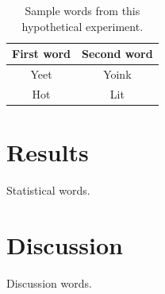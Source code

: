 \documentclass[man,12pt,floatsintext]{apa7}
\begin{document}
\begin{table}[h]
    \caption{Sample words from this hypothetical experiment.}
    \centering
    \begin{tabular}{cc}
        \hline 
         First word & Second word \\
         \hline
         Yeet & Yoink \\
         Hot & Lit \\
         \hline
    \end{tabular}
    \label{tab:table_words}
\end{table}

\section{Results}
Statistical words.

\section{Discussion}
Discussion words.

\end{document}
